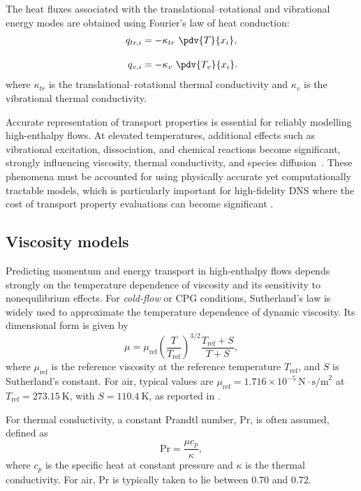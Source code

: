 The heat fluxes associated with the translational--rotational and vibrational energy modes are obtained using Fourier's law of heat conduction:
\begin{align}
    q_{tr,i} &= - \kappa_{tr} \ \pdv{T}{x_i}, \\[1em]
    q_{v,i} &= - \kappa_{v} \ \pdv{T_v}{x_i}.
\end{align}
where $\kappa_{tr}$ is the translational--rotational thermal conductivity and $\kappa_{v}$ is the vibrational thermal conductivity.

Accurate representation of transport properties is essential for reliably modelling high-enthalpy flows. At elevated temperatures, additional effects such as vibrational excitation, dissociation, and chemical reactions become significant, strongly influencing viscosity, thermal conductivity, and species diffusion~\citep{Vincenti1965}. These phenomena must be accounted for using physically accurate yet computationally tractable models, which is particularly important for high-fidelity \gls{DNS} where the cost of transport property evaluations can become significant \citep{Musawi2025}.

\subsection{Viscosity models}
Predicting momentum and energy transport in high-enthalpy flows depends strongly on the temperature dependence of viscosity and its sensitivity to nonequilibrium effects. For \textit{cold-flow} or \gls{CPG} conditions, Sutherland's law is widely used to approximate the temperature dependence of dynamic viscosity. Its dimensional form is given by
\begin{equation}
\mu = \mu_{\text{ref}} \left(\frac{T}{T_{\text{ref}}}\right)^{3/2} \frac{T_{\text{ref}} + S}{T + S},
\end{equation}
where $\mu_{\text{ref}}$ is the reference viscosity at the reference temperature $T_{\text{ref}}$, and $S$ is Sutherland's constant. For air, typical values are $\mu_{\text{ref}} = 1.716 \times 10^{-5}~\text{N}\!\cdot\!\text{s/m}^2$ at $T_{\text{ref}} = 273.15~\text{K}$, with $S = 110.4~\text{K}$, as reported in \citet{Hirschel2015}.

For thermal conductivity, a constant Prandtl number, \gls{Pr}, is often assumed, defined as
\begin{equation}
\mathrm{Pr} = \frac{\mu c_p}{\kappa},
\end{equation}
where $c_p$ is the specific heat at constant pressure and $\kappa$ is the thermal conductivity. For air, $\mathrm{Pr}$ is typically taken to lie between 0.70 and 0.72.


